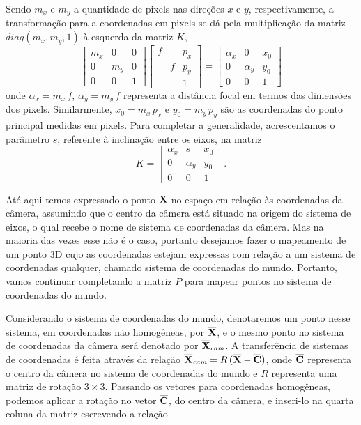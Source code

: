 Sendo $m_x$ e $m_y$ a quantidade de pixels nas direções $x$ e $y$, respectivamente, a transformação para a coordenadas em pixels se dá pela multiplicação da matriz $diag(m_x,m_y,1)$ à esquerda da matriz $K$,
\begin{equation*}
\begin{bmatrix}
m_x&0&0\\
0&m_y&0\\
0&0&1
\end{bmatrix}      
\begin{bmatrix}
f& &p_x\\
&f&p_y\\
& &1
\end{bmatrix}
=
\begin{bmatrix}
\alpha_x&0&x_0\\
0&\alpha_y&y_0\\
0&0&1
\end{bmatrix}
\end{equation*}
onde $\alpha_x=m_x\,f$, $\alpha_y=m_y\,f$ representa a distância focal em termos das dimensões dos pixels. Similarmente, $x_0=m_x\,p_x$ e $y_0=m_y\,p_y$ são as coordenadas do ponto principal medidas em pixels. Para completar a generalidade, acrescentamos o parâmetro $s$, referente à inclinação entre os eixos, na matriz
\begin{equation*}
K=
\begin{bmatrix}
\alpha_x&s&x_0\\
0&\alpha_y&y_0\\
0&0&1
\end{bmatrix}.
\end{equation*}






Até aqui temos expressado o ponto $\mathbf{X}$ no espaço em relação às coordenadas da câmera, assumindo que o centro da câmera está situado na origem do sistema de eixos, o qual recebe o nome de sistema de coordenadas da câmera. Mas na maioria das vezes esse não é o caso, portanto desejamos fazer o mapeamento de um ponto 3D cujo as coordenadas estejam expressas com relação a um sistema de coordenadas qualquer, chamado sistema de coordenadas do mundo. Portanto, vamos continuar completando a matriz $P$ para mapear pontos no sistema de coordenadas do mundo.

Considerando o sistema de coordenadas do mundo, denotaremos um ponto nesse sistema, em coordenadas não homogêneas, por $\overline{\mathbf{X}}$, e o mesmo ponto no sistema de coordenadas da câmera será denotado por $\overline{\mathbf{X}}_{\textit{cam}}$. A transferência de sistemas de coordenadas é feita através da relação $\overline{\mathbf{X}}_{\textit{cam}}=R\,(\overline{\mathbf{X}}-\overline{\bf C})$, onde $\overline{\bf C}$ representa o centro da câmera no sistema de coordenadas do mundo e $R$ representa uma matriz de rotação $3\times3$. Passando os vetores para coordenadas homogêneas, podemos aplicar a rotação no vetor $\overline{\bf C}$, do centro da câmera, e inseri-lo na quarta coluna da matriz escrevendo a relação

